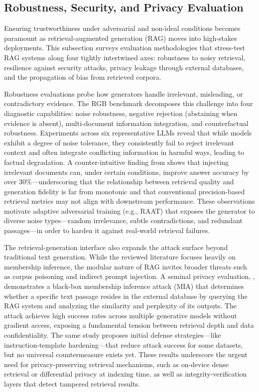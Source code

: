 \documentclass[11pt,a4paper]{article}
\begin{document}
\subsection{Robustness, Security, and Privacy Evaluation}


Ensuring trustworthiness under adversarial and non-ideal conditions becomes paramount as retrieval-augmented generation (RAG) moves into high-stakes deployments. This subsection surveys evaluation methodologies that stress-test RAG systems along four tightly intertwined axes: robustness to noisy retrieval, resilience against security attacks, privacy leakage through external databases, and the propagation of bias from retrieved corpora.

Robustness evaluations probe how generators handle irrelevant, misleading, or contradictory evidence. The RGB benchmark \cite{arxiv:2309.01431v2} decomposes this challenge into four diagnostic capabilities: noise robustness, negative rejection (abstaining when evidence is absent), multi-document information integration, and counterfactual robustness. Experiments across six representative LLMs reveal that while models exhibit a degree of noise tolerance, they consistently fail to reject irrelevant context and often integrate conflicting information in harmful ways, leading to factual degradation. A counter-intuitive finding from \cite{arxiv:2401.14887v3} shows that injecting irrelevant documents can, under certain conditions, improve answer accuracy by over 30\%---underscoring that the relationship between retrieval quality and generation fidelity is far from monotonic and that conventional precision-based retrieval metrics may not align with downstream performance. These observations motivate adaptive adversarial training (e.g., RAAT) that exposes the generator to diverse noise types---random irrelevance, subtle contradictions, and redundant passages---in order to harden it against real-world retrieval failures.

The retrieval-generation interface also expands the attack surface beyond traditional text generation. While the reviewed literature focuses heavily on membership inference, the modular nature of RAG invites broader threats such as corpus poisoning and indirect prompt injection. A seminal privacy evaluation, \cite{arxiv:2405.20446v2}, demonstrates a black-box membership inference attack (MIA) that determines whether a specific text passage resides in the external database by querying the RAG system and analyzing the similarity and perplexity of its outputs. The attack achieves high success rates across multiple generative models without gradient access, exposing a fundamental tension between retrieval depth and data confidentiality. The same study proposes initial defense strategies---like instruction-template hardening---that reduce attack success for some datasets, but no universal countermeasure exists yet. These results underscore the urgent need for privacy-preserving retrieval mechanisms, such as on-device dense retrieval or differential privacy at indexing time, as well as integrity-verification layers that detect tampered retrieval results.
\end{document}
